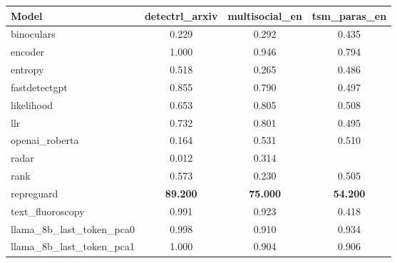 \begin{tabular}{lccc}
\hline
Model & detectrl\_arxiv & multisocial\_en & tsm\_paras\_en \\
\hline
binoculars & 0.229 & 0.292 & 0.435 \\
encoder & 1.000 & 0.946 & 0.794 \\
entropy & 0.518 & 0.265 & 0.486 \\
fastdetectgpt & 0.855 & 0.790 & 0.497 \\
likelihood & 0.653 & 0.805 & 0.508 \\
llr & 0.732 & 0.801 & 0.495 \\
openai\_roberta & 0.164 & 0.531 & 0.510 \\
radar & 0.012 & 0.314 &  \\
rank & 0.573 & 0.230 & 0.505 \\
repreguard & \textbf{89.200} & \textbf{75.000} & \textbf{54.200} \\
text\_fluoroscopy & 0.991 & 0.923 & 0.418 \\
\hline
llama\_8b\_last\_token\_pca0 & 0.998 & 0.910 & 0.934 \\
llama\_8b\_last\_token\_pca1 & 1.000 & 0.904 & 0.906 \\
\hline
\end{tabular}
